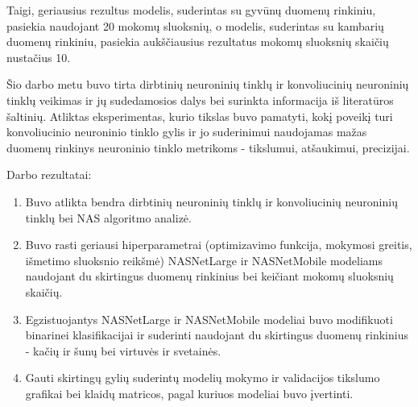 \documentclass{VUMIFPSbakalaurinis}
\begin{document}
Taigi, geriausius rezultus modelis, suderintas su gyvūnų duomenų rinkiniu, pasiekia naudojant 20 mokomų sluoksnių, o modelis, suderintas su kambarių duomenų rinkiniu, pasiekia aukščiausius rezultatus mokomų sluoksnių skaičių nustačius 10.

Šio darbo metu buvo tirta dirbtinių neuroninių tinklų ir konvoliucinių neuroninių tinklų veikimas 
ir jų sudedamosios dalys bei surinkta informacija iš literatūros šaltinių. Atliktas eksperimentas, 
kurio tikslas buvo pamatyti, kokį poveikį turi konvoliucinio neuroninio tinklo gylis ir jo suderinimui 
naudojamas mažas duomenų rinkinys neuroninio tinklo metrikoms - tikslumui, atšaukimui, precizijai.

Darbo rezultatai:
\begin{enumerate}
    \item Buvo atlikta bendra dirbtinių neuroninių tinklų ir konvoliucinių neuroninių tinklų bei NAS algoritmo analizė.
    \item Buvo rasti geriausi hiperparametrai (optimizavimo funkcija, mokymosi greitis, išmetimo sluoksnio reikšmė) NASNetLarge ir NASNetMobile modeliams naudojant du skirtingus duomenų rinkinius bei keičiant mokomų sluoksnių skaičių.
    \item Egzistuojantys NASNetLarge ir NASNetMobile modeliai buvo modifikuoti binarinei klasifikacijai ir suderinti naudojant du skirtingus duomenų rinkinius - kačių ir šunų bei virtuvės ir svetainės.
    \item Gauti skirtingų gylių suderintų modelių mokymo ir validacijos tikslumo grafikai bei klaidų matricos, pagal kuriuos modeliai buvo įvertinti.
\end{enumerate}
\end{document}

